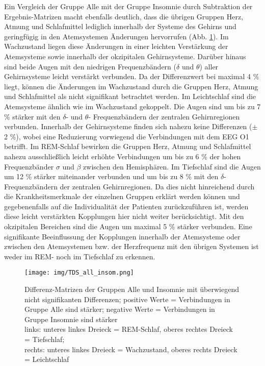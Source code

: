 Ein Vergleich der Gruppe Alle mit der Gruppe Insomnie durch Subtraktion der Ergebnis-Matrizen macht ebenfalls deutlich, dass die übrigen Gruppen Herz, Atmung und Schlafmittel lediglich innerhalb der Systeme des Gehirns und geringfügig in den Atemsystemen Änderungen hervorrufen (Abb. \ref{fig:TDSall_insom}). Im Wachzustand liegen diese Änderungen in einer leichten Verstärkung der Atemsysteme sowie innerhalb der okzipitalen Gehirnsysteme. Darüber hinaus sind beide Augen mit den niedrigen Frequenzbändern ($\delta$ und $\theta$) aller Gehirnsysteme leicht verstärkt verbunden. Da der Differenzwert bei maximal 4 \% liegt, können die Änderungen im Wachzustand durch die Gruppen Herz, Atmung und Schlafmittel als nicht signifikant betrachtet werden. Im Leichtschlaf sind die Atemsysteme ähnlich wie im Wachzustand gekoppelt. Die Augen sind um bis zu 7 \% stärker mit den $\delta$- und $\theta$- Frequenzbändern der zentralen Gehirnregionen verbunden. Innerhalb der Gehirnsysteme finden sich nahezu keine Differenzen ($\pm$ 2 \%), wobei eine Reduzierung vorwiegend die Verbindungen mit dem \acs{EEG} O1 betrifft. Im \acs{REM}-Schlaf bewirken die Gruppen Herz, Atmung und Schlafmittel nahezu ausschließlich leicht erhöhte Verbindungen um bis zu 6 \% der hohen Frequenzbänder $\sigma$ und $\beta$ zwischen den Hemisphären. Im Tiefschlaf sind die Augen um 12 \% stärker miteinander verbunden und um bis zu 8 \% mit den $\delta$-Frequenzbändern der zentralen Gehirnregionen. Da dies nicht hinreichend durch die Krankheitsmerkmale der einzelnen Gruppen erklärt werden können und gegebenenfalls auf die Individualität der Patienten zurückzuführen ist, werden diese leicht verstärkten Kopplungen hier nicht weiter berücksichtigt. Mit den okzipitalen Bereichen sind die Augen um maximal 5 \% stärker verbunden. Eine signifikante Beeinflussung der Kopplungen innerhalb der Atemsysteme oder zwischen den Atemsystemen bzw. der Herzfrequenz mit den übrigen Systemen ist weder im \acs{REM}- noch im Tiefschlaf zu erkennen.\\

\begin{figure}[H]
	\centering
	\texttt{[image: img/TDS\_all\_insom.png]}
	\caption[Differenzen zwischen Gruppe Alle und Insomnie]{Differenz-Matrizen der Gruppen Alle und Insomnie mit überwiegend nicht signifikanten Differenzen; positive Werte = Verbindungen in Gruppe Alle sind stärker; negative Werte = Verbindungen in Gruppe Insomnie sind stärker\\links: unteres linkes Dreieck = \acs{REM}-Schlaf, oberes rechtes Dreieck = Tiefschlaf;\\rechts: unteres linkes Dreieck = Wachzustand, oberes rechts Dreieck = Leichtschlaf}
	\label{fig:TDSall_insom}
\end{figure}

